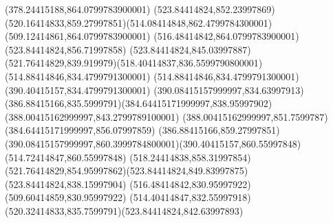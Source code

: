 {{	\lineto(378.24415188,864.0799783900001)
	\closepath
	\moveto(523.84414824,852.23997869)
	\curveto(520.16414833,859.27997851)(514.08414848,862.4799784300001)(509.12414861,864.0799783900001)
	\lineto(516.48414842,864.0799783900001)
	\lineto(523.84414824,856.71997858)
	\closepath
	\moveto(523.84414824,845.03997887)
	\curveto(521.76414829,839.919979)(518.40414837,836.5599790800001)(514.88414846,834.4799791300001)
	\lineto(514.88414846,834.4799791300001)
	\lineto(390.40415157,834.4799791300001)
	\curveto(390.08415157999997,834.63997913)(386.88415166,835.5999791)(384.64415171999997,838.95997902)
	\lineto(388.00415162999997,843.2799789100001)
	\lineto(388.00415162999997,851.7599787)
	\lineto(384.64415171999997,856.07997859)
	\curveto(386.88415166,859.27997851)(390.08415157999997,860.3999784800001)(390.40415157,860.55997848)
	\lineto(514.72414847,860.55997848)
	\curveto(518.24414838,858.31997854)(521.76414829,854.95997862)(523.84414824,849.83997875)
	\closepath
	\moveto(523.84414824,838.15997904)
	\lineto(516.48414842,830.95997922)
	\lineto(509.60414859,830.95997922)
	\curveto(514.40414847,832.55997918)(520.32414833,835.7599791)(523.84414824,842.63997893)
	\closepath
}
}
{
}
